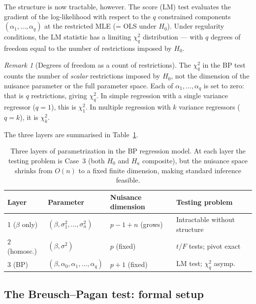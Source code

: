 \documentclass[a4paper,oneside,12pt]{extarticle}
\theoremstyle{plain}
\theoremstyle{definition}
\theoremstyle{remark}
\newtheorem{remark}[proposition]{Remark}
\begin{document}
The structure is now tractable, however.  The score (LM) test
evaluates the gradient of the log-likelihood with respect to the
$q$ constrained components $(\alpha_1,\ldots,\alpha_q)$ at the
restricted MLE (= OLS under $H_0$).  Under regularity conditions,
the LM statistic has a limiting $\chi^2_q$ distribution — with
$q$ degrees of freedom equal to the number of restrictions imposed
by $H_0$.

\begin{remark}[Degrees of freedom as a count of restrictions]
The $\chi^2_q$ in the BP test counts the number of \emph{scalar}
restrictions imposed by $H_0$, not the dimension of the nuisance
parameter or the full parameter space.  Each of $\alpha_1,\ldots,
\alpha_q$ is set to zero: that is $q$ restrictions, giving
$\chi^2_q$.  In simple regression with a single variance regressor
($q=1$), this is $\chi^2_1$.  In multiple regression with $k$
variance regressors ($q=k$), it is $\chi^2_k$.
\end{remark}

The three layers are summarised in Table~\ref{tab:layers}.

\begin{table}[ht]
\centering
\small
\begin{tabular}{llll}
\toprule
Layer & Parameter & Nuisance dimension & Testing problem \\
\midrule
1 ($\beta$ only) & $(\beta,\sigma_1^2,\ldots,\sigma_n^2)$ & $p-1+n$ (grows) & Intractable without structure \\
2 (homosc.)      & $(\beta,\sigma^2)$                     & $p$ (fixed)     & $t$/$F$ tests; pivot exact \\
3 (BP)           & $(\beta,\alpha_0,\alpha_1,\ldots,\alpha_q)$ & $p+1$ (fixed) & LM test; $\chi^2_q$ asymp. \\
\bottomrule
\end{tabular}
\caption{Three layers of parametrization in the BP regression model.
At each layer the testing problem is Case~3 (both $H_0$ and $H_a$
composite), but the nuisance space shrinks from $O(n)$ to a fixed
finite dimension, making standard inference feasible.}
\label{tab:layers}
\end{table}


\subsection{The Breusch--Pagan test: formal setup}
\end{document}
